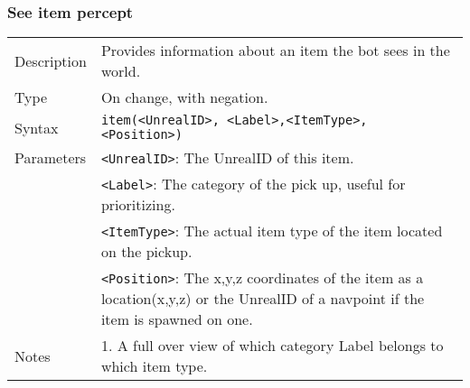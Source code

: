 \documentclass[11pt,a4paper]{article}
\begin{document}
\subsubsection*{See item percept}
\begin{small}
\begin{tabular}{p{2cm}p{9cm}}
Description & Provides information about an item the bot sees in the world.\\
Type & On change, with negation.\\
Syntax & \verb|item(<UnrealID>, <Label>,<ItemType>, <Position>)|\\ 
Parameters &
\verb|<UnrealID>|: The UnrealID of this item.\\
& \verb|<Label>|: The category of the pick up, useful for prioritizing.\\
& \verb|<ItemType>|: The actual item type of the item located on the pickup. \\
& \verb|<Position>|: The x,y,z coordinates of the item as a location(x,y,z) or the UnrealID of a navpoint if the item is spawned on one.\\
Notes &
	1.	A full over view of which category Label belongs to which item type.
\end{tabular}
\end{small}
\\\\
\end{document}

